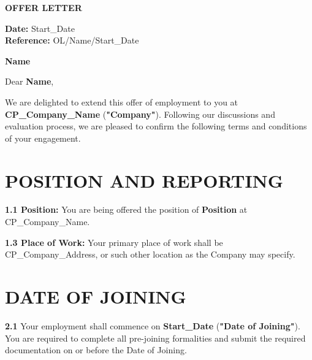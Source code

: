 \documentclass[10pt]{article}
\begin{document}
\thispagestyle{empty}

\begin{center}
  {\fontsize{15pt}{19pt}\selectfont\textbf{OFFER LETTER}}
\end{center}

\vspace{6pt}
\noindent\textbf{Date:} {{Start_Date}}\\
\noindent\textbf{Reference:} OL/{{Name}}/{{Start_Date}}

\vspace{10pt}
\noindent\textbf{{{Name}}}\\

\vspace{10pt}
\noindent Dear \textbf{{{Name}}},

\vspace{8pt}
\noindent We are delighted to extend this offer of employment to you at \textbf{{{CP_Company_Name}}} (\textbf{"Company"}). Following our discussions and evaluation process, we are pleased to confirm the following terms and conditions of your engagement.

\section{POSITION AND REPORTING}

\textbf{1.1 Position:} You are being offered the position of \textbf{{{Position}}} at {{CP_Company_Name}}.


\textbf{1.3 Place of Work:} Your primary place of work shall be {{CP_Company_Address}}, or such other location as the Company may specify.

\section{DATE OF JOINING}

\textbf{2.1} Your employment shall commence on \textbf{{{Start_Date}}} (\textbf{"Date of Joining"}). You are required to complete all pre-joining formalities and submit the required documentation on or before the Date of Joining.
\end{document}
